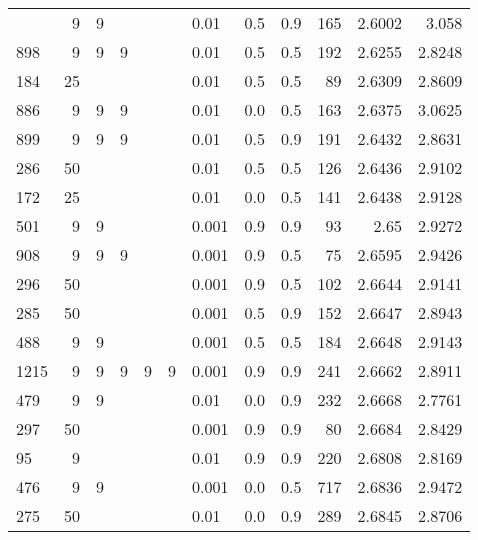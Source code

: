 \begin{longtable}{lrrrrrlrrrrr}
\bottomrule
\endlastfoot
  491 &       9 & 9 &   &   &   &          0.01 &      0.5 &    0.9 &     165 &     2.6002 &         3.058 \\
  898 &       9 & 9 & 9 &   &   &          0.01 &      0.5 &    0.5 &     192 &     2.6255 &        2.8248 \\
  184 &      25 &   &   &   &   &          0.01 &      0.5 &    0.5 &      89 &     2.6309 &        2.8609 \\
  886 &       9 & 9 & 9 &   &   &          0.01 &      0.0 &    0.5 &     163 &     2.6375 &        3.0625 \\
  899 &       9 & 9 & 9 &   &   &          0.01 &      0.5 &    0.9 &     191 &     2.6432 &        2.8631 \\
  286 &      50 &   &   &   &   &          0.01 &      0.5 &    0.5 &     126 &     2.6436 &        2.9102 \\
  172 &      25 &   &   &   &   &          0.01 &      0.0 &    0.5 &     141 &     2.6438 &        2.9128 \\
  501 &       9 & 9 &   &   &   &         0.001 &      0.9 &    0.9 &      93 &       2.65 &        2.9272 \\
  908 &       9 & 9 & 9 &   &   &         0.001 &      0.9 &    0.5 &      75 &     2.6595 &        2.9426 \\
  296 &      50 &   &   &   &   &         0.001 &      0.9 &    0.5 &     102 &     2.6644 &        2.9141 \\
  285 &      50 &   &   &   &   &         0.001 &      0.5 &    0.9 &     152 &     2.6647 &        2.8943 \\
  488 &       9 & 9 &   &   &   &         0.001 &      0.5 &    0.5 &     184 &     2.6648 &        2.9143 \\
 1215 &       9 & 9 & 9 & 9 & 9 &         0.001 &      0.9 &    0.9 &     241 &     2.6662 &        2.8911 \\
  479 &       9 & 9 &   &   &   &          0.01 &      0.0 &    0.9 &     232 &     2.6668 &        2.7761 \\
  297 &      50 &   &   &   &   &         0.001 &      0.9 &    0.9 &      80 &     2.6684 &        2.8429 \\
   95 &       9 &   &   &   &   &          0.01 &      0.9 &    0.9 &     220 &     2.6808 &        2.8169 \\
  476 &       9 & 9 &   &   &   &         0.001 &      0.0 &    0.5 &     717 &     2.6836 &        2.9472 \\
  275 &      50 &   &   &   &   &          0.01 &      0.0 &    0.9 &     289 &     2.6845 &        2.8706 \\

\end{longtable}
